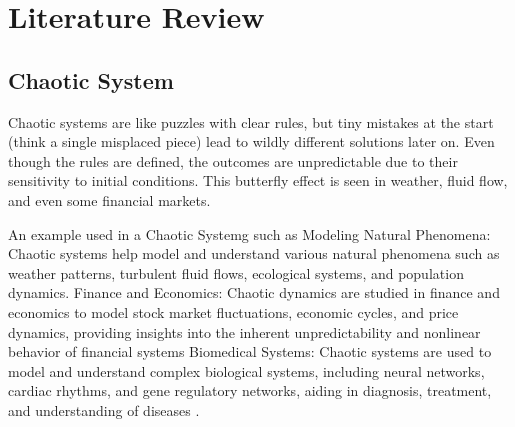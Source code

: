 \documentclass[11pt]{article}
\theoremstyle{definition}
\begin{document}
\section{Literature Review}

\subsection{Chaotic System}
Chaotic systems are like puzzles with clear rules, but tiny mistakes at the start (think a single misplaced piece) lead to wildly different solutions later on. Even though the rules are defined, the outcomes are unpredictable due to their sensitivity to initial conditions. This butterfly effect is seen in weather, fluid flow, and even some financial markets.

An example used in a Chaotic Systemg such as Modeling Natural Phenomena: Chaotic systems help model and understand various natural phenomena such as weather patterns, turbulent fluid flows, ecological systems, and population dynamics.\cite{may_simple_1976}
Finance and Economics: Chaotic dynamics are studied in finance and economics to model stock market fluctuations, economic cycles, and price dynamics, providing insights into the inherent unpredictability and nonlinear behavior of financial systems \cite{mandelbrot_variation_1962}
Biomedical Systems: Chaotic systems are used to model and understand complex biological systems, including neural networks, cardiac rhythms, and gene regulatory networks, aiding in diagnosis, treatment, and understanding of diseases \cite{izhikevich_neural_2000}.
\end{document}
